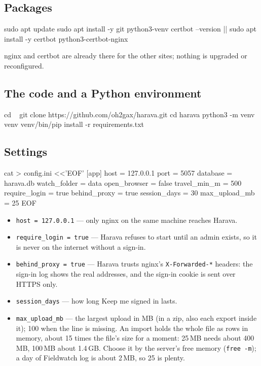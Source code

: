 \documentclass[10pt,a4paper]{article}
\newcommand{\ui}[1]{\textsf{\small #1}}
\begin{document}
\subsection{Packages}
\begin{cmd}
sudo apt update
sudo apt install -y git python3-venv
certbot --version || sudo apt install -y certbot python3-certbot-nginx
\end{cmd}
nginx and certbot are already there for the other sites; nothing is upgraded or reconfigured.

\subsection{The code and a Python environment}
\begin{cmd}
cd ~
git clone https://github.com/oh2gax/harava.git
cd harava
python3 -m venv venv
venv/bin/pip install -r requirements.txt
\end{cmd}

\subsection{Settings}\label{sec:config}
\begin{cmd}
cat > config.ini <<'EOF'
[app]
host = 127.0.0.1
port = 5057
database = harava.db
watch_folder = data
open_browser = false
travel_min_m = 500
require_login = true
behind_proxy = true
session_days = 30
max_upload_mb = 25
EOF
\end{cmd}
\begin{itemize}[leftmargin=1.2em]
\item \texttt{host = 127.0.0.1} --- only nginx on the same machine reaches Harava.
\item \texttt{require\_login = true} --- Harava refuses to start until an admin exists, so it is never on the internet without a sign-in.
\item \texttt{behind\_proxy = true} --- Harava trusts nginx's \texttt{X-Forwarded-*} headers: the sign-in log shows the real addresses, and the sign-in cookie is sent over HTTPS only.
\item \texttt{session\_days} --- how long \ui{Keep me signed in} lasts.
\item \texttt{max\_upload\_mb} --- the largest upload in MB (in a zip, also each export inside it); 100 when the line is missing. An import holds the whole file as rows in memory, about 15 times the file's size for a moment: 25\,MB needs about 400\,MB, 100\,MB about 1.4\,GB. Choose it by the server's free memory (\texttt{free -m}); a day of Fieldwatch log is about 2\,MB, so 25 is plenty.
\end{itemize}
\end{document}
